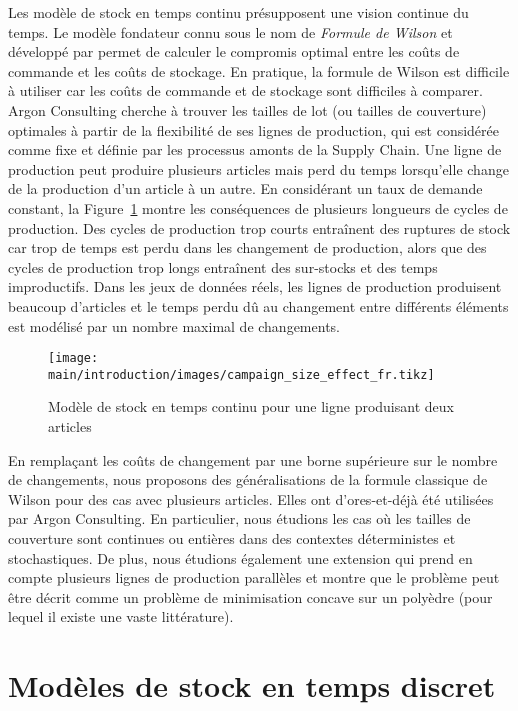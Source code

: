 Les modèle de stock en temps continu présupposent une vision continue du temps.
Le modèle fondateur connu sous le nom de \emph{Formule de Wilson} et développé par \citet{Harris1913} permet de calculer le compromis optimal entre les coûts de commande et les coûts de stockage.
En pratique, la formule de Wilson est difficile à utiliser car les coûts de commande et de stockage sont difficiles à comparer.
Argon Consulting cherche à trouver les tailles de lot (ou tailles de couverture) optimales à partir de la flexibilité de ses lignes de production, qui est considérée comme fixe et définie par les processus amonts de la Supply Chain.
Une ligne de production peut produire plusieurs articles mais perd du temps lorsqu'elle change de la production d'un article à un autre.
En considérant un taux de demande constant, la Figure~\ref{fig:intro:fr:continuous-time-inventory-model} montre les conséquences de plusieurs longueurs de cycles de production.
Des cycles de production trop courts entraînent des ruptures de stock car trop de temps est perdu dans les changement de production, alors que des cycles de production trop longs entraînent des sur-stocks et des temps improductifs.
Dans les jeux de données réels, les lignes de production produisent beaucoup d'articles et le temps perdu dû au changement entre différents éléments est modélisé par un nombre maximal de changements.


\begin{figure}[!ht]
  \centering
  \texttt{[image: main/introduction/images/campaign\_size\_effect\_fr.tikz]}
  \caption{Modèle de stock en temps continu pour une ligne produisant deux articles}
  \label{fig:intro:fr:continuous-time-inventory-model}
\end{figure}


\medskip


En remplaçant les coûts de changement par une borne supérieure sur le nombre de changements, nous proposons des généralisations de la formule classique de Wilson pour des cas avec plusieurs articles.
Elles ont d'ores-et-déjà été utilisées par Argon Consulting.
En particulier, nous étudions les cas où les tailles de couverture sont continues ou entières dans des contextes déterministes et stochastiques.
De plus, nous étudions également une extension qui prend en compte plusieurs lignes de production parallèles et montre que le problème peut être décrit comme un problème de minimisation concave sur un polyèdre (pour lequel il existe une vaste littérature).


\section{Modèles de stock en temps discret}
\label{sec:intro:fr:discrete-time-inventory-models}


